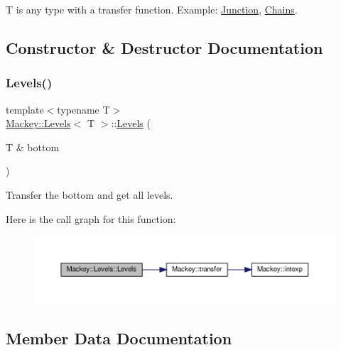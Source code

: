 T is any type with a transfer function. Example\+: \hyperlink{classMackey_1_1Junction}{Junction}, \hyperlink{classMackey_1_1Chains}{Chains}. 

\subsection{Constructor \& Destructor Documentation}
\mbox{\label{classMackey_1_1Levels_a450b9aba828f03dd340e89169a4bd9e0}} 
\subsubsection{\texorpdfstring{Levels()}{Levels()}}
{\footnotesize\ttfamily template$<$typename T$>$ \\
\hyperlink{classMackey_1_1Levels}{Mackey\+::\+Levels}$<$ T $>$\+::\hyperlink{classMackey_1_1Levels}{Levels} (\begin{DoxyParamCaption}\item[{T \&}]{bottom }\end{DoxyParamCaption})\hspace{0.3cm}{\ttfamily [inline]}}



Transfer the bottom and get all levels. 

Here is the call graph for this function\+:\nopagebreak
\begin{figure}[H]
\begin{center}
\leavevmode
\includegraphics[width=350pt]{classMackey_1_1Levels_a450b9aba828f03dd340e89169a4bd9e0_cgraph}
\end{center}
\end{figure}


\subsection{Member Data Documentation}
\mbox{\label{classMackey_1_1Levels_af9a1391f683685ae464829b9b32162c8}} 
